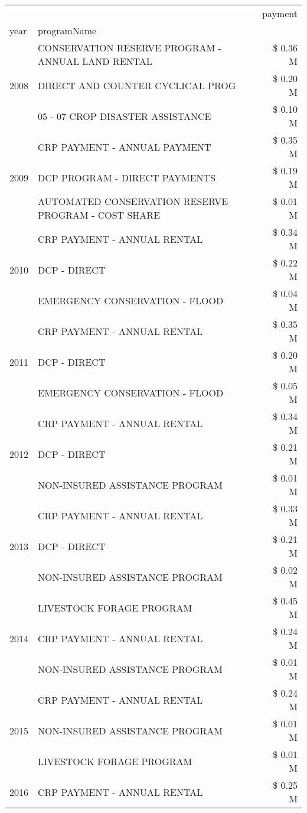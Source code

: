 \begin{tabular}{llr}
\toprule
 &  & payment \\
year & programName &  \\
\midrule
\multirow[t]{3}{*}{2008} & CONSERVATION RESERVE PROGRAM - ANNUAL LAND RENTAL & \$ 0.36 M \\
 & DIRECT AND COUNTER CYCLICAL PROG & \$ 0.20 M \\
 & 05 - 07 CROP DISASTER ASSISTANCE & \$ 0.10 M \\
\cline{1-3}
\multirow[t]{3}{*}{2009} & CRP PAYMENT - ANNUAL PAYMENT & \$ 0.35 M \\
 & DCP PROGRAM - DIRECT PAYMENTS & \$ 0.19 M \\
 & AUTOMATED CONSERVATION RESERVE PROGRAM - COST SHARE & \$ 0.01 M \\
\cline{1-3}
\multirow[t]{3}{*}{2010} & CRP PAYMENT - ANNUAL RENTAL & \$ 0.34 M \\
 & DCP - DIRECT & \$ 0.22 M \\
 & EMERGENCY CONSERVATION - FLOOD & \$ 0.04 M \\
\cline{1-3}
\multirow[t]{3}{*}{2011} & CRP PAYMENT - ANNUAL RENTAL & \$ 0.35 M \\
 & DCP - DIRECT & \$ 0.20 M \\
 & EMERGENCY CONSERVATION - FLOOD & \$ 0.05 M \\
\cline{1-3}
\multirow[t]{3}{*}{2012} & CRP PAYMENT - ANNUAL RENTAL & \$ 0.34 M \\
 & DCP - DIRECT & \$ 0.21 M \\
 & NON-INSURED ASSISTANCE PROGRAM & \$ 0.01 M \\
\cline{1-3}
\multirow[t]{3}{*}{2013} & CRP PAYMENT - ANNUAL RENTAL & \$ 0.33 M \\
 & DCP - DIRECT & \$ 0.21 M \\
 & NON-INSURED ASSISTANCE PROGRAM & \$ 0.02 M \\
\cline{1-3}
\multirow[t]{3}{*}{2014} & LIVESTOCK FORAGE PROGRAM & \$ 0.45 M \\
 & CRP PAYMENT - ANNUAL RENTAL & \$ 0.24 M \\
 & NON-INSURED ASSISTANCE PROGRAM & \$ 0.01 M \\
\cline{1-3}
\multirow[t]{3}{*}{2015} & CRP PAYMENT - ANNUAL RENTAL & \$ 0.24 M \\
 & NON-INSURED ASSISTANCE PROGRAM & \$ 0.01 M \\
 & LIVESTOCK FORAGE PROGRAM & \$ 0.01 M \\
\cline{1-3}
\multirow[t]{3}{*}{2016} & CRP PAYMENT - ANNUAL RENTAL & \$ 0.25 M \\

\end{tabular}
